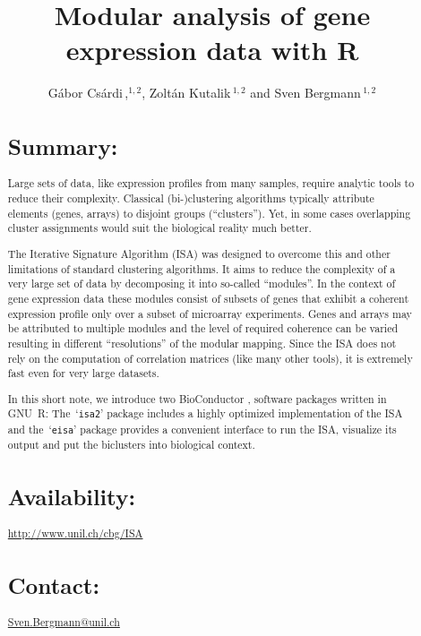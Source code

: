 \documentclass{bioinfo}
\newcommand{\Rpackage}[1]{`\texttt{#1}'}
\begin{document}

\title[Modular analysis]{Modular analysis of gene expression data with R}
\author[G\'abor Cs\'ardi \textit{et~al}]{G\'abor Cs\'ardi\,,$^{1,2}$,
  Zolt\'an Kutalik\,$^{1,2}$ and Sven Bergmann\,$^{1,2}$}
\address{$^{1}$Department of Medical Genetics, and
  $^{2}$Swiss Institute of Bioinformatics,
  University of Lausanne, Rue de Bugnon 27, CH-1005 Lausanne,
  Switzerland.}



\maketitle

\begin{abstract}
\section{Summary:}
Large sets of data, like expression profiles from many samples, require
analytic tools to reduce their complexity. Classical (bi-)clustering
algorithms typically attribute elements (genes, arrays) to disjoint groups
(``clusters''). Yet, in some cases overlapping cluster assignments would suit
the biological reality much better.

The Iterative Signature Algorithm (ISA) was designed to overcome this and
other limitations of standard clustering algorithms. It aims to reduce the
complexity of a very large set of data by decomposing it into so-called
``modules''. In the context of gene expression data these modules consist of
subsets of genes that exhibit a coherent expression profile only over a
subset of microarray experiments. Genes and arrays may be attributed to
multiple modules and the level of required coherence can be varied resulting
in different ``resolutions'' of the modular mapping. Since the ISA does not
rely on the computation of correlation matrices (like many other tools), it
is extremely fast even for very large datasets.

In this short note, we introduce two BioConductor \citep{BioC}, software
packages written in GNU~R: The~\Rpackage{isa2} package includes a highly optimized
implementation of the ISA and the~\Rpackage{eisa} package provides a convenient interface
to run the ISA, visualize its output and put the biclusters into
biological context.

\section{Availability:}
\href{http://www.unil.ch/cbg/ISA}%
{\url{http://www.unil.ch/cbg/ISA}}
\section{Contact:} \href{Sven.Bergmann@unil.ch}{Sven.Bergmann@unil.ch}
\end{abstract}
\end{document}
